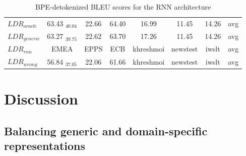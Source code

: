 \documentclass[11pt,a4paper]{article}
\begin{document}
\begin{table}[!h]
\begin{center}
{\begin{tabular}{|l|ccc|ccc||c|}
\hline
$LDR_{oracle}$   & 63.43 $_{40.04}$ & 22.66 & 64.40 & 16.99 & 11.45 & 14.26 & avg\\
$LDR_{generic}$ & 63.27 $_{39.75}$ & 22.62 & 63.70 & 17.26 & 11.45 & 14.26 & avg\\
$LDR_{rnn}$        & EMEA & EPPS & ECB & khreshmoi & newstest & iwslt & avg\\
$LDR_{wrong}$   & 56.84 $_{37.05}$ & 22.06 & 61.66 & khreshmoi & newstest & iwslt & avg \\
\hline
\end{tabular}
} %
\end{center}
\caption{BPE-detokenized BLEU scores for the RNN architecture \label{tab:results-rnn}}
\end{table}

\section{Discussion\label{sec:Discussion}}

\subsection{Balancing generic and domain-specific representations\label{secc:region_size}}
\end{document}
